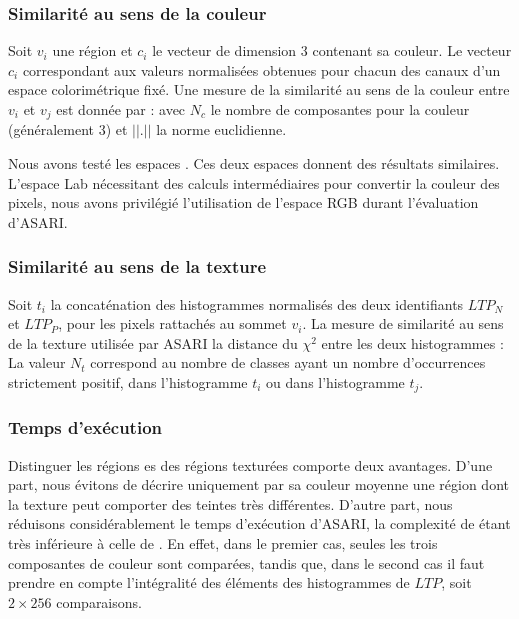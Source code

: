 \subsubsection{Similarité au sens de la couleur}
Soit $v_{i}$ une région et  $c_{i}$ le vecteur de dimension $3$ contenant sa couleur. Le vecteur $c_{i}$ correspondant aux valeurs normalisées obtenues pour chacun des canaux d'un espace colorimétrique fixé. Une mesure de la similarité au sens de la couleur entre $v_{i}$ et $v_{j}$ est donnée par :
avec $N_{c}$ le nombre de composantes pour la couleur (généralement $3$) et $||.||$ la norme euclidienne.

Nous avons testé les espaces . Ces deux espaces donnent des résultats similaires. L'espace Lab nécessitant des calculs intermédiaires pour convertir la couleur des pixels, nous avons privilégié l'utilisation de l'espace RGB durant l'évaluation d'ASARI.

\subsubsection{Similarité au sens de la texture}
Soit  $t_{i}$ la concaténation des histogrammes normalisés des deux identifiants $LTP_{N}$ et $LTP_{P}$, pour les pixels rattachés au sommet $v_{i}$. La mesure de similarité au sens de la texture utilisée par ASARI  la distance du $\chi^{2}$ entre les deux histogrammes :
La valeur $N_{t}$ correspond au nombre de classes ayant un nombre d’occurrences strictement positif, dans l'histogramme $t_{i}$ ou dans  l'histogramme $t_{j}$. 

\subsubsection{Temps d'exécution}

Distinguer les régions es des régions texturées comporte deux avantages. D'une part, nous évitons de décrire uniquement par sa couleur moyenne une région dont la texture peut comporter des teintes très différentes. D'autre part, nous réduisons considérablement le temps d'exécution d'ASARI, la complexité de  étant très inférieure à celle de . En effet, dans le premier cas, seules les trois composantes de couleur sont comparées, tandis que, dans le second cas\modif{,} il faut prendre en compte l'intégralité des éléments des histogrammes de $LTP$, soit $2\times256$ comparaisons. 

